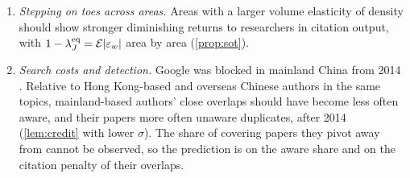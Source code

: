 \begin{enumerate}[label=\textbf{P\arabic*.},leftmargin=*]
\item \emph{Stepping on toes across areas.} Areas with a larger volume elasticity
of density should show stronger diminishing returns to researchers in citation
output, with $1-\lambda_J^{\rm eq}=\mathcal E|\varepsilon_w|$ area by area
(\cref{prop:sot}).
\item \emph{Search costs and detection.} Google was blocked in mainland China
from 2014 \citep{zhengwang2020}. Relative to Hong Kong-based and overseas
Chinese authors in the same topics, mainland-based authors' close overlaps
should have become less often aware, and their papers more often unaware
duplicates, after 2014 (\cref{lem:credit} with lower $\sigma$). The share of
covering papers they pivot away from cannot be observed, so the prediction is
on the aware share and on the citation penalty of their overlaps.
\end{enumerate}

